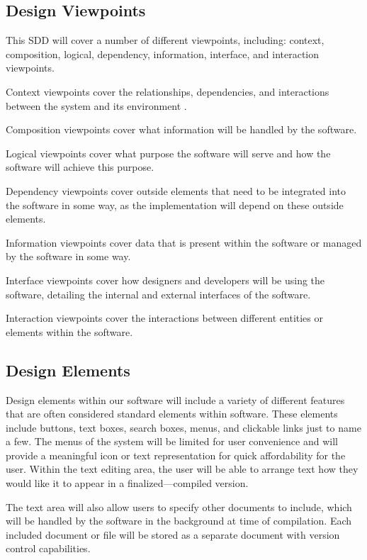 \documentclass[letterpaper, 10pt, draftclsnofoot, compsoc, onecolumn]{IEEEtran}
\begin{document}
\subsection{Design Viewpoints}
{\noindent This SDD will cover a number of different viewpoints, including:
context, composition, logical, dependency, information, interface, and interaction viewpoints.

Context viewpoints cover the relationships, dependencies, and
interactions between the system and its environment \cite{viewpoints}.

Composition viewpoints cover what information will be handled by the software.

Logical viewpoints cover what purpose the software will serve and how the software will achieve this purpose.

Dependency viewpoints cover outside elements that need to be integrated
into the software in some way, as the implementation will depend on these outside elements.

Information viewpoints cover data that is present within the software or managed by the software in some way.

Interface viewpoints cover how designers and developers will be using the software,
detailing the internal and external interfaces of the software.

Interaction viewpoints cover the interactions between different entities or elements within the software. \par}

\subsection{Design Elements}
{\noindent Design elements within our software will include a variety of different
features that are often considered standard elements within software.
These elements include buttons, text boxes, search boxes, menus, and clickable links just to name a few.
The menus of the system will be limited for user convenience and will provide a meaningful icon or text representation
for quick affordability for the user. Within the text editing area, the user will be able to arrange
text how they would like it to appear in a finalized---compiled version.

The text area will also allow users to specify other documents to include,
which will be handled by the software in the background at time of compilation.
Each included document or file will be stored as a separate document with version control capabilities. \par}
\end{document}
